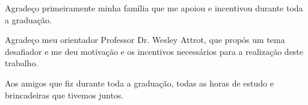 \begin{agradecimentos}
        Agradeço primeiramente minha família que me apoiou e incentivou durante 
toda a graduação.
        
Agradeço meu orientador Professor Dr. Wesley Attrot, que propós um tema
desafiador e me deu motivação e os incentivos necessários para a realização
deste trabalho.

Aos amigos que fiz durante toda a graduação, todas as horas de estudo
e brincadeiras que tivemos juntos.

\end{agradecimentos}
